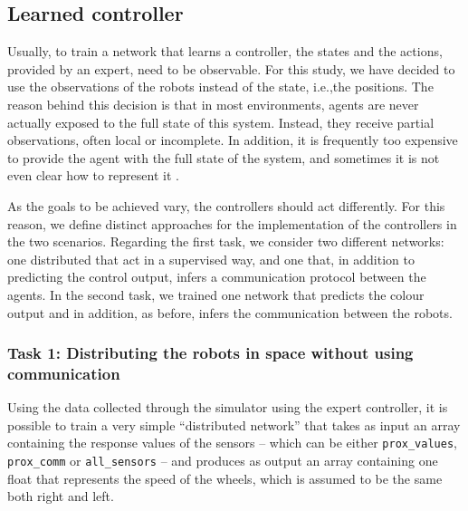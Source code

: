 \begin{lstlisting}[frame=none,caption={Protocol used by the manual controller 
to decide, for each robot, the message to transmit and the colour.}, 
label=lst:manualtask2]
\end{lstlisting}


\subsection{Learned controller}
\label{subsec:learned}

Usually, to train a network that learns a controller, the states and the actions, 
provided by an expert, need to be observable. For this study, we have decided to 
use the observations of the robots instead of the state, i.e.,the positions. 
The reason behind this decision is that in most environments, agents are never 
actually exposed to the full state of this system. Instead, they receive partial 
observations, often local or incomplete. In addition, it is frequently too expensive 
to provide the agent with the full state of the system, and sometimes it is not even 
clear how to represent it \cite[][]{ml-agents}.

As the goals to be achieved vary, the controllers should act differently. For this 
reason, we define distinct approaches for the implementation of the controllers 
in the two scenarios.
Regarding the first task, we consider two different networks: one distributed that 
act in a supervised way, and one that, in addition to predicting the control output, 
infers a communication protocol between the agents. 
In the second task, we trained one network that predicts the colour output and in 
addition, as before, infers the communication between the robots.

\subsubsection{Task 1: Distributing the robots in space without using 
communication}

Using the data collected through the simulator using the expert controller, it is 
possible to train a very simple ``distributed network'' that takes as input an array 
containing the response values of the sensors – which can be either 
\texttt{prox\_values}, \texttt{prox\_comm} or \texttt{all\_sensors} – and produces 
as output an array containing one float that represents the speed of the wheels, 
which is assumed to be the same both right and left.

